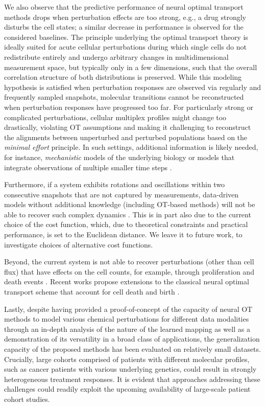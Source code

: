 We also observe that the predictive performance of neural optimal transport methods drops when perturbation effects are too strong, e.g., a drug strongly disturbs the cell states; a similar decrease in performance is observed for the considered baselines.
The principle underlying the optimal transport theory is ideally suited for acute cellular perturbations during which single cells do not redistribute entirely and undergo arbitrary changes in multidimensional measurement space, but typically only in a few dimensions, such that the overall correlation structure of both distributions is preserved. While this modeling hypothesis is satisfied when perturbation responses are observed via regularly and frequently sampled snapshots, molecular transitions cannot be reconstructed when perturbation responses have progressed too far. For particularly strong or complicated perturbations, cellular multiplex profiles might change too drastically, violating OT assumptions and making it challenging to reconstruct the alignments between unperturbed and perturbed populations based on the \emph{minimal effort} principle.
In such settings, additional information is likely needed, for instance, \emph{mechanistic} models of the underlying biology or models that integrate observations of multiple smaller time steps \citep{raue2015data2dynamics, busch2015fundamental}. 

Furthermore, if a system exhibits rotations and oscillations within two consecutive snapshots that are not captured by measurements, data-driven models without additional knowledge (including OT-based methods) will not be able to recover such complex dynamics \citep{weinreb2018fundamental}. This is in part also due to the current choice of the cost function, which, due to theoretical constraints and practical performance, is set to the Euclidean distance. We leave it to future work, to investigate choices of alternative cost functions. 

Beyond, the current system is not able to recover perturbations (other than cell flux) that have effects on the cell counts, for example, through proliferation and death events \citep{tritschler2019concepts}. Recent works propose extensions to the classical neural optimal transport scheme that account for cell death and birth \citep{lubeck2022neural, pariset2023unbalanced, chen2022most, baradat2021regularized}.

 Lastly, despite having provided a proof-of-concept of the capacity of neural OT methods to model various chemical perturbations for different data modalities through an in-depth analysis of the nature of the learned mapping as well as a demonstration of its versatility in a broad class of applications, the generalization capacity of the proposed methods has been evaluated on relatively small datasets.
Crucially, large cohorts comprised of patients with different molecular profiles, such as cancer patients with various underlying genetics, could result in strongly heterogeneous treatment responses.
It is evident that approaches addressing these challenges could readily exploit the upcoming availability of large-scale patient cohort studies.

